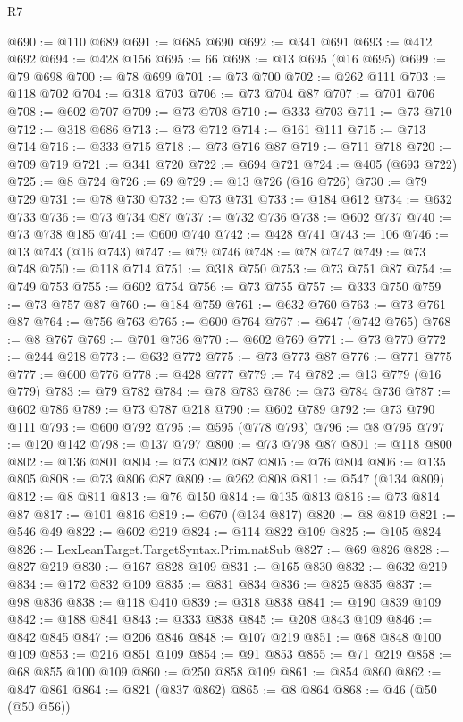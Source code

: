\begin{lexlean}{R7}
\begin{coremodule}
@690 := @110 @689
@691 := @685 @690
@692 := @341 @691
@693 := @412 @692
@694 := @428 @156
@695 := 66
@698 := @13 @695 (@16 @695)
@699 := @79 @698
@700 := @78 @699
@701 := @73 @700
@702 := @262 @111
@703 := @118 @702
@704 := @318 @703
@706 := @73 @704 @87
@707 := @701 @706
@708 := @602 @707
@709 := @73 @708
@710 := @333 @703
@711 := @73 @710
@712 := @318 @686
@713 := @73 @712
@714 := @161 @111
@715 := @713 @714
@716 := @333 @715
@718 := @73 @716 @87
@719 := @711 @718
@720 := @709 @719
@721 := @341 @720
@722 := @694 @721
@724 := @405 (@693 @722)
@725 := @8 @724
@726 := 69
@729 := @13 @726 (@16 @726)
@730 := @79 @729
@731 := @78 @730
@732 := @73 @731
@733 := @184 @612
@734 := @632 @733
@736 := @73 @734 @87
@737 := @732 @736
@738 := @602 @737
@740 := @73 @738 @185
@741 := @600 @740
@742 := @428 @741
@743 := 106
@746 := @13 @743 (@16 @743)
@747 := @79 @746
@748 := @78 @747
@749 := @73 @748
@750 := @118 @714
@751 := @318 @750
@753 := @73 @751 @87
@754 := @749 @753
@755 := @602 @754
@756 := @73 @755
@757 := @333 @750
@759 := @73 @757 @87
@760 := @184 @759
@761 := @632 @760
@763 := @73 @761 @87
@764 := @756 @763
@765 := @600 @764
@767 := @647 (@742 @765)
@768 := @8 @767
@769 := @701 @736
@770 := @602 @769
@771 := @73 @770
@772 := @244 @218
@773 := @632 @772
@775 := @73 @773 @87
@776 := @771 @775
@777 := @600 @776
@778 := @428 @777
@779 := 74
@782 := @13 @779 (@16 @779)
@783 := @79 @782
@784 := @78 @783
@786 := @73 @784 @736
@787 := @602 @786
@789 := @73 @787 @218
@790 := @602 @789
@792 := @73 @790 @111
@793 := @600 @792
@795 := @595 (@778 @793)
@796 := @8 @795
@797 := @120 @142
@798 := @137 @797
@800 := @73 @798 @87
@801 := @118 @800
@802 := @136 @801
@804 := @73 @802 @87
@805 := @76 @804
@806 := @135 @805
@808 := @73 @806 @87
@809 := @262 @808
@811 := @547 (@134 @809)
@812 := @8 @811
@813 := @76 @150
@814 := @135 @813
@816 := @73 @814 @87
@817 := @101 @816
@819 := @670 (@134 @817)
@820 := @8 @819
@821 := @546 @49
@822 := @602 @219
@824 := @114 @822 @109
@825 := @105 @824
@826 := LexLeanTarget.TargetSyntax.Prim.natSub
@827 := @69 @826
@828 := @827 @219
@830 := @167 @828 @109
@831 := @165 @830
@832 := @632 @219
@834 := @172 @832 @109
@835 := @831 @834
@836 := @825 @835
@837 := @98 @836
@838 := @118 @410
@839 := @318 @838
@841 := @190 @839 @109
@842 := @188 @841
@843 := @333 @838
@845 := @208 @843 @109
@846 := @842 @845
@847 := @206 @846
@848 := @107 @219
@851 := @68 @848 @100 @109
@853 := @216 @851 @109
@854 := @91 @853
@855 := @71 @219
@858 := @68 @855 @100 @109
@860 := @250 @858 @109
@861 := @854 @860
@862 := @847 @861
@864 := @821 (@837 @862)
@865 := @8 @864
@868 := @46 (@50 (@50 @56))

\end{coremodule}
\end{lexlean}
